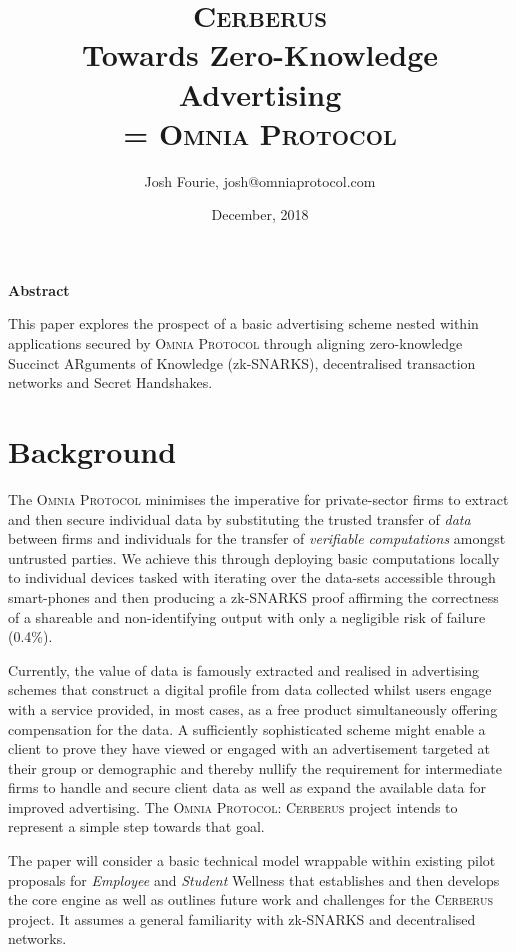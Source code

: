 \documentclass{article}
\title{\textsc{Cerberus} \\ Towards Zero-Knowledge Advertising\\
	\parskip = \baselineskip
	\large{\textsc{Omnia Protocol}}}
\author{Josh Fourie, josh@omniaprotocol.com}
\date{December, 2018}
\begin{document}
\maketitle
	
	\begin{center}
	\textbf{Abstract}
	\end{center}

This paper explores the prospect of a basic advertising scheme nested within applications secured by \textsc{Omnia Protocol} through aligning zero-knowledge Succinct ARguments of Knowledge (zk-SNARKS), decentralised transaction networks and Secret Handshakes. 

\pagebreak 
	
	\section{Background}
	
		The \textsc{Omnia Protocol} minimises the imperative for private-sector firms to extract and then secure individual data by substituting the trusted transfer of \textit{data} between firms and individuals for the transfer of \textit{verifiable computations} amongst untrusted parties. We achieve this through deploying basic computations locally to individual devices tasked with iterating over the data-sets accessible through smart-phones and then producing a zk-SNARKS proof affirming the correctness of a shareable and non-identifying output with only a negligible risk of failure (0.4\%).
		
		Currently, the value of data is famously extracted and realised in advertising schemes that construct a digital profile from data collected whilst users engage with a service provided, in most cases, as a free product simultaneously offering compensation for the data. A sufficiently sophisticated scheme might enable a client to prove they have viewed or engaged with an advertisement targeted at their group or demographic and thereby nullify the requirement for intermediate firms to handle and secure client data as well as expand the available data for improved advertising. The  \textsc{Omnia Protocol: Cerberus} project intends to represent a simple step towards that goal.
		
		The paper will consider a basic technical model wrappable within existing pilot proposals for \textit{Employee} and \textit{Student} Wellness that establishes and then develops the core engine  as well as outlines future work and challenges for the \textsc{Cerberus} project. It assumes a general familiarity with zk-SNARKS and decentralised networks.
		
\end{document}
